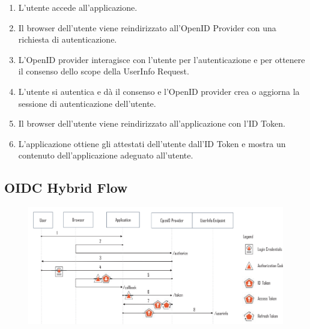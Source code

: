 \begin{enumerate}
      \item L'utente accede all'applicazione.
      \item Il browser dell'utente viene reindirizzato all'OpenID Provider con una
            richiesta di autenticazione.
      \item L'OpenID provider interagisce con l'utente per l'autenticazione e per
            ottenere il consenso dello scope della UserInfo Request.
      \item L'utente si autentica e dà il consenso e l'OpenID provider crea o aggiorna
            la sessione di autenticazione dell'utente.
      \item Il browser dell'utente viene reindirizzato all'applicazione con l'ID Token.
      \item L'applicazione ottiene gli attestati dell'utente dall'ID Token e mostra un
            contenuto dell'applicazione adeguato all'utente.
\end{enumerate}

\subsection{OIDC Hybrid Flow}

\begin{figure}[H]
      \centering
      \includegraphics[width=\textwidth, keepaspectratio]{capitoli/id_managing/imgs/hybridflow.png}
\end{figure}

